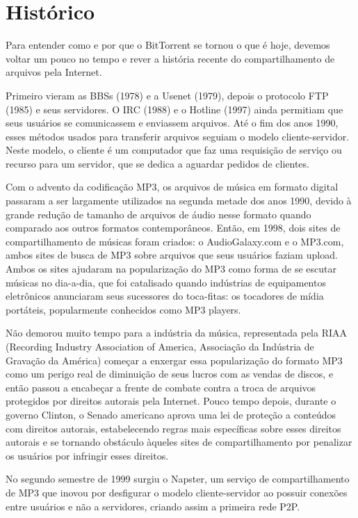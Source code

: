 
\chapter{Histórico}

Para entender como e por que o BitTorrent se tornou o que é hoje, devemos voltar um pouco no tempo e rever a história recente do compartilhamento de arquivos pela Internet. 

Primeiro vieram as BBSs (1978) e a Usenet (1979), depois o protocolo FTP (1985) e seus servidores. O IRC (1988) e o Hotline (1997) ainda permitiam que seus usuários se comunicassem e enviassem arquivos. Até o fim dos anos 1990, esses métodos usados para transferir arquivos seguiam o modelo cliente-servidor. Neste modelo, o cliente é um computador que faz uma requisição de serviço ou recurso para um servidor, que se dedica a aguardar pedidos de clientes. 

Com o advento da codificação MP3, os arquivos de música em formato digital passaram a ser largamente utilizados na segunda metade dos anos 1990, devido à grande redução de tamanho de arquivos de áudio nesse formato quando comparado aos outros formatos contemporâneos. Então, em 1998, dois sites de compartilhamento de músicas foram criados: o AudioGalaxy.com e o MP3.com, ambos sites de busca de MP3 sobre arquivos que seus usuários faziam upload. Ambos os sites ajudaram na popularização do MP3 como forma de se escutar músicas no dia-a-dia, que foi catalisado quando indústrias de equipamentos eletrônicos anunciaram seus sucessores do toca-fitas: os tocadores de mídia portáteis, popularmente conhecidos como MP3 players.

Não demorou muito tempo para a indústria da música, representada pela RIAA (Recording Industry Association of America, Associação da Indústria de Gravação da América) começar a enxergar essa popularização do formato MP3 como um perigo real de diminuição de seus lucros com as vendas de discos, e então passou a encabeçar a frente de combate contra a troca de arquivos protegidos por direitos autorais pela Internet. Pouco tempo depois, durante o governo Clinton, o Senado americano aprova uma lei de proteção a conteúdos com direitos autorais, estabelecendo regras mais específicas sobre esses direitos autorais e se tornando obstáculo àqueles sites de compartilhamento por penalizar os usuários por infringir esses direitos. 

No segundo semestre de 1999 surgiu o Napster, um serviço de compartilhamento de MP3 que inovou por desfigurar o modelo cliente-servidor ao possuir conexões entre usuários e não a servidores, criando assim a primeira rede P2P.

